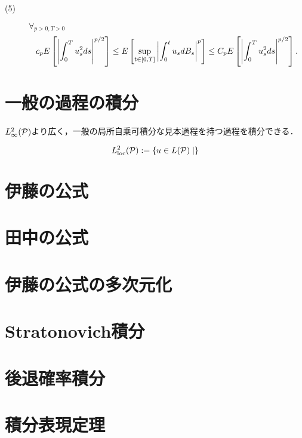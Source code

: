 \documentclass[uplatex,dvipdfmx]{jsreport}
\begin{document}
\begin{corollary}
    \begin{description}
        \item[(5)] $\forall_{p>0,T>0}$
        \[c_pE\Square{\Abs{\int^T_0u^2_sds}^{p/2}}\le E\Square{\sup_{t\in[0,T]}\Abs{\int^t_0u_sdB_s}^p}\le C_pE\Square{\Abs{\int^T_0u^2_sds}^{p/2}}.\]
    \end{description}
\end{corollary}

\section{一般の過程の積分}

\begin{tcolorbox}[colframe=ForestGreen, colback=ForestGreen!10!white,breakable,colbacktitle=ForestGreen!40!white,coltitle=black,fonttitle=\bfseries\sffamily,
title=]
    $L^2_\infty(\P)$より広く，一般の局所自乗可積分な見本過程を持つ過程を積分できる．
\end{tcolorbox}

\begin{notation}
    \[L^2_\loc(\P):=\Brace{u\in L(\P)\mid}\]
\end{notation}

\section{伊藤の公式}

\section{田中の公式}

\section{伊藤の公式の多次元化}

\section{Stratonovich積分}

\section{後退確率積分}

\section{積分表現定理}
\end{document}
